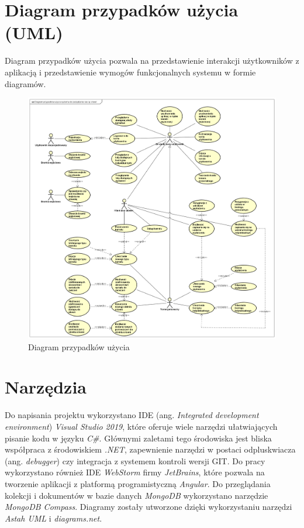 \documentclass[a4paper,twoside,12pt]{book}
\newcommand{\obcy}[1]{\emph{#1}}
\newcommand{\ang}[1]{{\selectlanguage{british}\obcy{#1}}}
\begin{document}
	\section {Diagram przypadków użycia (UML)}
	Diagram przypadków użycia pozwala na przedstawienie interakcji użytkowników z aplikacją i przedstawienie wymogów funkcjonalnych systemu w formie diagramów.
	
\begin{figure}[h!t!b]
	\includegraphics[height=1\textheight, width=1\textwidth]{diagram_przypadków_użycia.png}
	\caption{Diagram przypadków użycia}
	\label{fig:diagramPrzpydakowUzyciaUML}
\end{figure}
	
	\section{Narzędzia}
	Do napisania projektu wykorzystano IDE (ang. \ang{Integrated development environment}) \textit{Visual Studio 2019}, które oferuje wiele narzędzi ułatwiających pisanie kodu w języku \textit{C\#}. Głównymi zaletami tego środowiska jest bliska współpraca z środowiskiem \textit{.NET}, zapewnienie narzędzi w postaci odpluskwiacza (ang. \ang{debugger}) czy integracja z systemem kontroli wersji GIT. Do pracy wykorzystano również IDE \textit{WebStorm} firmy \textit{JetBrains}, które pozwala na tworzenie aplikacji z platformą programistyczną \textit{Angular}. Do przeglądania kolekcji i dokumentów w bazie danych \textit{MongoDB} wykorzystano narzędzie \textit{MongoDB Compass}. Diagramy zostały utworzone dzięki wykorzystaniu narzędzi \textit{Astah UML} i \textit{diagrams.net}.
	
\end{document}
